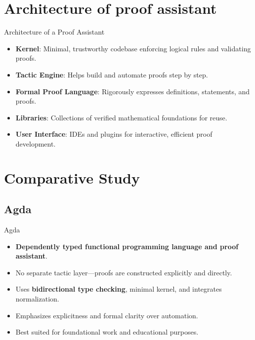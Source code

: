 \documentclass[aspectratio=169, compress, 12pt]{beamer}
\begin{document}
\section{Architecture of proof assistant}
\begin{frame}{Architecture of a Proof Assistant}
\begin{itemize}
    \item \textbf{Kernel}: Minimal, trustworthy codebase enforcing logical rules and validating proofs.
    \item \textbf{Tactic Engine}: Helps build and automate proofs step by step.
    \item \textbf{Formal Proof Language}: Rigorously expresses definitions, statements, and proofs.
    \item \textbf{Libraries}: Collections of verified mathematical foundations for reuse.
    \item \textbf{User Interface}: IDEs and plugins for interactive, efficient proof development.
\end{itemize}
\end{frame}
\section{Comparative Study}
\subsection*{Agda}
\begin{frame}{Agda}
\begin{itemize}
    \item \textbf{Dependently typed functional programming language and proof assistant}.
    \item No separate tactic layer---proofs are constructed explicitly and directly.
    \item Uses \textbf{bidirectional type checking}, minimal kernel, and integrates normalization.
    \item Emphasizes explicitness and formal clarity over automation.
    \item Best suited for foundational work and educational purposes.
\end{itemize}
\end{frame}
\end{document}
